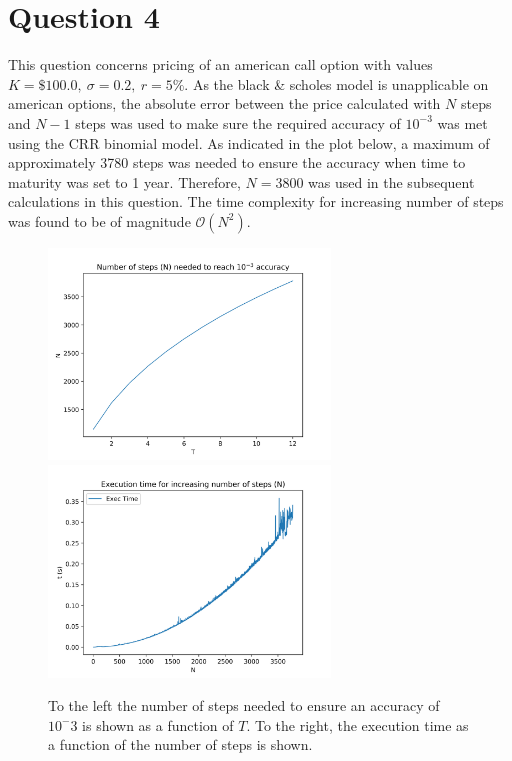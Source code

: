 \documentclass{article}
\begin{document}
\section*{Question 4}

This question concerns pricing of an american call option with values $K = \$100.0, \ \sigma = 0.2, \ r = 5\%$. As the black \& scholes model is unapplicable on american options, the absolute error between the price calculated with $N$ steps and $N-1$ steps was used to make sure the required accuracy of $10^{-3}$ was met using the CRR binomial model. As indicated in the plot below, a maximum of approximately 3780 steps was needed to ensure the accuracy when time to maturity was set to 1 year. Therefore, $N=3800$ was used in the subsequent calculations in this question. The time complexity for increasing number of steps was found to be of magnitude $\mathcal{O}(N^2)$.

\begin{figure}[H]
	\centering
	\includegraphics[width=75mm]{images/q4_n.png}
	\includegraphics[width=75mm]{images/q4_time.png}
	\caption{To the left the number of steps needed to ensure an accuracy of $10^-3$ is shown as a function of $T$. To the right, the execution time as a function of the number of steps is shown.}
\end{figure}
\end{document}
